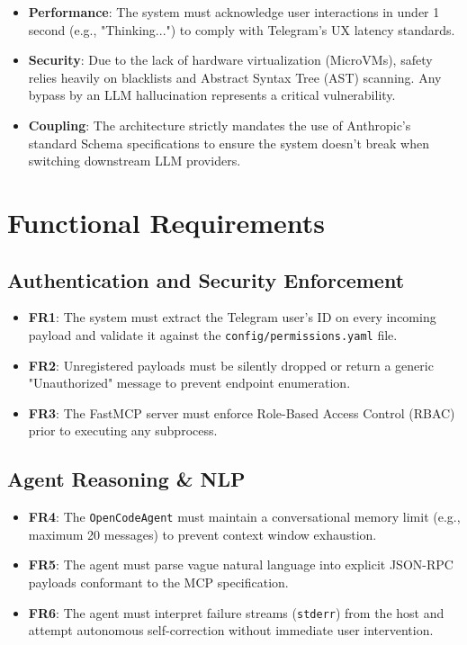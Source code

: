 \documentclass{scrreprt}
\begin{document}
\begin{itemize}
    \item \textbf{Performance}: The system must acknowledge user interactions in under 1 second (e.g., "Thinking...") to comply with Telegram's UX latency standards.
    \item \textbf{Security}: Due to the lack of hardware virtualization (MicroVMs), safety relies heavily on blacklists and Abstract Syntax Tree (AST) scanning. Any bypass by an LLM hallucination represents a critical vulnerability.
    \item \textbf{Coupling}: The architecture strictly mandates the use of Anthropic's standard Schema specifications to ensure the system doesn't break when switching downstream LLM providers.
\end{itemize}

\chapter{Functional Requirements}

\section{Authentication and Security Enforcement}
\begin{itemize}
    \item \textbf{FR1}: The system must extract the Telegram user's ID on every incoming payload and validate it against the \texttt{config/permissions.yaml} file.
    \item \textbf{FR2}: Unregistered payloads must be silently dropped or return a generic "Unauthorized" message to prevent endpoint enumeration.
    \item \textbf{FR3}: The FastMCP server must enforce Role-Based Access Control (RBAC) prior to executing any subprocess.
\end{itemize}

\section{Agent Reasoning \& NLP}
\begin{itemize}
    \item \textbf{FR4}: The \texttt{OpenCodeAgent} must maintain a conversational memory limit (e.g., maximum 20 messages) to prevent context window exhaustion.
    \item \textbf{FR5}: The agent must parse vague natural language into explicit JSON-RPC payloads conformant to the MCP specification.
    \item \textbf{FR6}: The agent must interpret failure streams (\texttt{stderr}) from the host and attempt autonomous self-correction without immediate user intervention.
\end{itemize}
\end{document}
